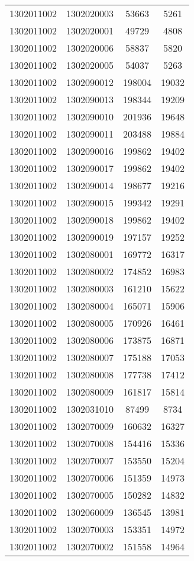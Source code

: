\begin{longtable}{llcc}
1302011002 & 1302020003 & 53663 & 5261\\
1302011002 & 1302020001 & 49729 & 4808\\
1302011002 & 1302020006 & 58837 & 5820\\
1302011002 & 1302020005 & 54037 & 5263\\
1302011002 & 1302090012 & 198004 & 19032\\
1302011002 & 1302090013 & 198344 & 19209\\
1302011002 & 1302090010 & 201936 & 19648\\
1302011002 & 1302090011 & 203488 & 19884\\
1302011002 & 1302090016 & 199862 & 19402\\
1302011002 & 1302090017 & 199862 & 19402\\
1302011002 & 1302090014 & 198677 & 19216\\
1302011002 & 1302090015 & 199342 & 19291\\
1302011002 & 1302090018 & 199862 & 19402\\
1302011002 & 1302090019 & 197157 & 19252\\
1302011002 & 1302080001 & 169772 & 16317\\
1302011002 & 1302080002 & 174852 & 16983\\
1302011002 & 1302080003 & 161210 & 15622\\
1302011002 & 1302080004 & 165071 & 15906\\
1302011002 & 1302080005 & 170926 & 16461\\
1302011002 & 1302080006 & 173875 & 16871\\
1302011002 & 1302080007 & 175188 & 17053\\
1302011002 & 1302080008 & 177738 & 17412\\
1302011002 & 1302080009 & 161817 & 15814\\
1302011002 & 1302031010 & 87499 & 8734\\
1302011002 & 1302070009 & 160632 & 16327\\
1302011002 & 1302070008 & 154416 & 15336\\
1302011002 & 1302070007 & 153550 & 15204\\
1302011002 & 1302070006 & 151359 & 14973\\
1302011002 & 1302070005 & 150282 & 14832\\
1302011002 & 1302060009 & 136545 & 13981\\
1302011002 & 1302070003 & 153351 & 14972\\
1302011002 & 1302070002 & 151558 & 14964\\

\end{longtable}
